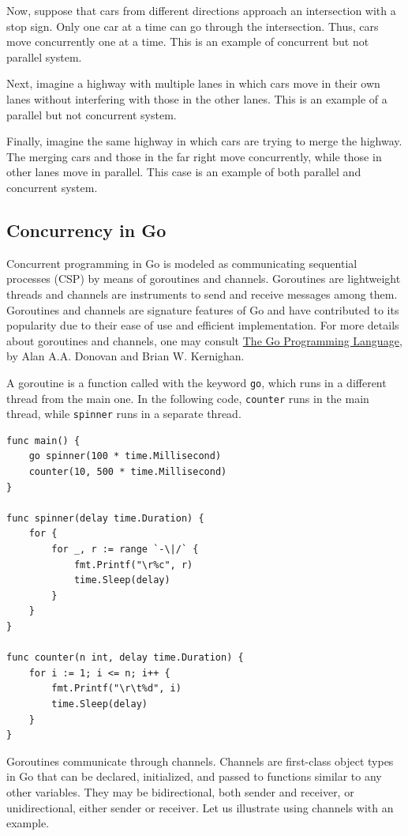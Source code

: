 \documentclass[11pt]{article}
\begin{document}
Now, suppose that cars from different directions approach an intersection with a stop sign. Only one car at a time can go through the intersection. Thus, cars move concurrently one at a time. This is an example of concurrent but not parallel system.

Next, imagine a highway with multiple lanes in which cars move in their own lanes without interfering with those in the other lanes. This is an example of a parallel but not concurrent system.

Finally, imagine the same highway in which cars are trying to merge the highway. The merging cars and those in the far right move concurrently, while those in other lanes move in parallel. This case is an example of both parallel and concurrent system.

\subsection*{Concurrency in Go}
\label{sec:orgheadline3}
Concurrent programming in Go is modeled as communicating sequential processes (CSP) by means of goroutines and channels. Goroutines are lightweight threads and channels are instruments to send and receive messages among them. Goroutines and channels are signature features of Go and have contributed to its popularity due to their ease of use and efficient implementation. For more details about goroutines and channels, one may consult \href{https://dl.acm.org/citation.cfm?id=2851099}{The Go Programming Language}, by Alan A.A. Donovan and Brian W. Kernighan.

A goroutine is a function called with the keyword \texttt{go}, which runs in a different thread from the main one. In the following code, \texttt{counter} runs in the main thread, while \texttt{spinner} runs in a separate thread.
\begin{verbatim}
func main() {
    go spinner(100 * time.Millisecond)
    counter(10, 500 * time.Millisecond)
}

func spinner(delay time.Duration) {
    for {
        for _, r := range `-\|/` {
            fmt.Printf("\r%c", r)
            time.Sleep(delay)
        }
    }
}

func counter(n int, delay time.Duration) {
    for i := 1; i <= n; i++ {
        fmt.Printf("\r\t%d", i)
        time.Sleep(delay)
    }
}
\end{verbatim}
Goroutines communicate through channels. Channels are first-class object types in Go that can be declared, initialized, and passed to functions similar to any other variables. They may be bidirectional, both sender and receiver, or unidirectional, either sender or receiver. Let us illustrate using channels with an example.
\end{document}

